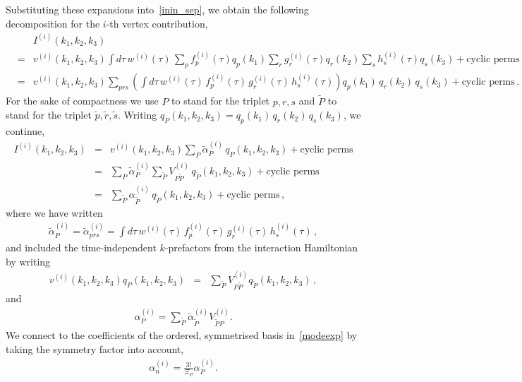 \documentclass[a4paper,12pt]{extarticle}
\newcommand{\threeqs}{q_p(k_1)\,q_r(k_2)\,q_s(k_3)}
\begin{document}
Substituting these expansions into~\eqref{inin_sep}, we obtain the following decomposition for the $i$-th vertex contribution,
\begin{eqnarray}\label{inin_kdep}
    &&I^{(i)}(k_1,k_2,k_3)\nonumber\\
    &=& v^{(i)}(k_1, k_2,k_3)\int d\tau\, w^{(i)}(\tau)\, \sum_p f_p^{(i)}(\tau) q_p(k_1)\sum_r g_r^{(i)}(\tau) q_r(k_2)\sum_s h_s^{(i)}(\tau) q_s(k_3) + \text{cyclic perms}\nonumber\\	
	&=& v^{(i)}(k_1, k_2,k_3)\sum_{prs}\left(\int d\tau\, w^{(i)}(\tau)\, f_p^{(i)}(\tau)\, g_r^{(i)}(\tau) \,h_s^{(i)}(\tau)\right)\threeqs + \text{cyclic perms}\nonumber\,.
\end{eqnarray}
For the sake of compactness we use $P$ to stand for the triplet $p,r,s$ and $\tilde{P}$ to stand for the triplet $\tilde{p},\tilde{r},\tilde{s}$.
Writing $q_{P}(k_1,k_2,k_3)=\threeqs$,
we continue,
\begin{eqnarray}\label{inin_kdep}
    I^{(i)}(k_1,k_2,k_3) & =& v^{(i)}(k_1, k_2,k_3) \sum_{P} \tilde{\alpha}_{P}^{(i)}\,  q_{P}(k_1,k_2,k_3) + \text{cyclic perms}\nonumber\\
    & =& \sum_{P} \tilde{\alpha}_{P}^{(i)}\sum_{\tilde{P}}V^{(i)}_{P\tilde{P}}\,  q_{\tilde{P}}(k_1,k_2,k_3) + \text{cyclic perms}\nonumber\\
    & =& \sum_{\tilde{P}} \alpha_{\tilde{P}}^{(i)}\,  q_{\tilde{P}}(k_1,k_2,k_3) + \text{cyclic perms} \,,
\end{eqnarray}
where we have written
\begin{eqnarray}\label{inin_kindep}
\tilde{\alpha}_P^{(i)} =  \tilde{\alpha}_{prs}^{(i)} 	= \int d\tau\, w^{(i)}(\tau)\, f_p^{(i)}(\tau) \,g_r^{(i)}(\tau) \,h_s^{(i)}(\tau)\,,
\end{eqnarray}
and included the time-independent $k$-prefactors from the interaction Hamiltonian by writing
\begin{eqnarray}\label{V_definition}
    v^{(i)}(k_1, k_2,k_3)q_P(k_1,k_2,k_3) &=& \sum_{\tilde{P}}V^{(i)}_{P\tilde{P}}q_{\tilde{P}}(k_1,k_2,k_3)\,,
\end{eqnarray}
and
\begin{eqnarray}
    \alpha_P^{(i)} = \sum_{\tilde{P}} \tilde{\alpha}_{\tilde{P}}^{(i)}V^{(i)}_{\tilde{P}P}.
\end{eqnarray}
We connect to the coefficients of the ordered, symmetrised basis in~\eqref{modeexp} by taking the symmetry factor into account,
\begin{eqnarray}
    \alpha_n^{(i)} = \frac{3!}{\Xi_P}\alpha_P^{(i)}.
\end{eqnarray}
\end{document}
